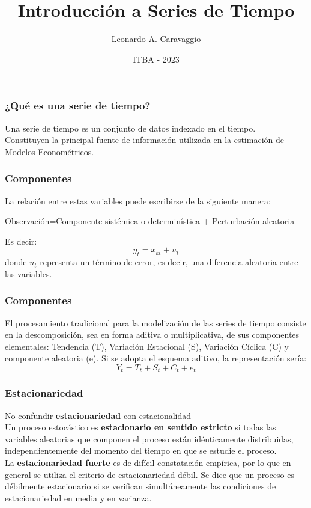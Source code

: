 \documentclass{beamer}
\title{Introducción a Series de Tiempo}
\author{Leonardo A. Caravaggio}
\date{ITBA - 2023}
\begin{document}
\maketitle

\begin{frame}
\frametitle{¿Qué es una serie de tiempo?}

\justify
Una serie de tiempo es un conjunto de datos indexado en el tiempo.\\
\vspace{5mm} %
Constituyen la principal fuente de información utilizada en la estimación de Modelos Econométricos. 
\end{frame}


\begin{frame}
\frametitle{Componentes}

\justify
La relación entre estas variables puede escribirse de la siguiente manera: \\
\vspace{5mm} %
\begin{center}
Observación=Componente sistémica o determinística + Perturbación aleatoria \\
\end{center}
\vspace{5mm} %
Es decir: 
\[
y_t=x_{kt}+u_t
\]
donde $u_t$ representa un término de error, es decir, una diferencia aleatoria entre las variables. 

\end{frame}


\begin{frame}
\frametitle{Componentes}

\justify
El procesamiento tradicional para la modelización de las series de tiempo consiste en la descomposición, sea en forma aditiva o multiplicativa, de sus componentes elementales: Tendencia (T), Variación Estacional (S), Variación Cíclica (C) y componente aleatoria (e). Si se adopta el esquema aditivo, la representación sería: 
\[
Y_t=T_t+S_t+C_t+e_t
\]
\end{frame}

\begin{frame}
\frametitle{Estacionariedad}
\justify
No confundir \textbf{estacionariedad} con estacionalidad\\
\vspace{5mm} %
Un proceso estocástico es \textbf{estacionario en sentido estricto} si todas las variables aleatorias que componen el proceso están idénticamente distribuidas, independientemente del momento del tiempo en que se estudie el proceso.\\
\vspace{5mm} %
La \textbf{estacionariedad fuerte} es de difícil constatación empírica, por lo que en general se utiliza el criterio de estacionariedad débil. Se dice que un proceso es débilmente estacionario si se verifican simultáneamente las condiciones de estacionariedad en media y en varianza.

\end{frame}
\end{document}
